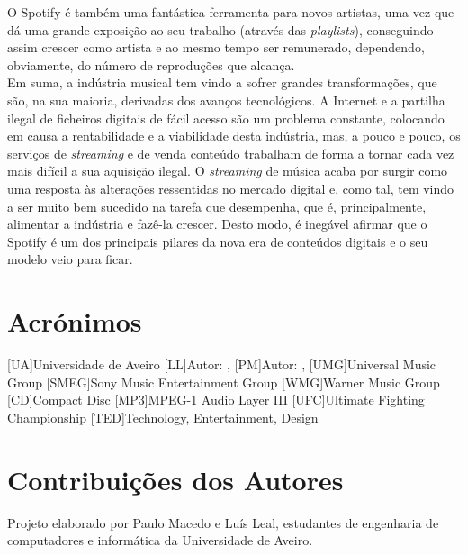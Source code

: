 O Spotify é também uma fantástica ferramenta para novos artistas, uma vez que dá uma grande exposição ao seu trabalho (através das \textit{playlists}), conseguindo assim crescer como artista e ao mesmo tempo ser remunerado, dependendo, obviamente, do número de reproduções que alcança.\\  
Em suma, a indústria musical tem vindo a sofrer grandes transformações, que são, na sua maioria, derivadas dos avanços tecnológicos. A Internet e a partilha ilegal de ficheiros digitais de fácil acesso são um problema constante, colocando em causa a rentabilidade e a viabilidade desta
indústria, mas, a pouco e pouco, os serviços de \textit{streaming} e de venda conteúdo trabalham de forma a tornar cada vez mais difícil a sua aquisição ilegal. O \textit{streaming} de música acaba por surgir como uma resposta às alterações ressentidas no mercado digital e, como tal, tem vindo a ser muito bem sucedido na tarefa que desempenha, que é, principalmente, alimentar a indústria e fazê-la crescer. Desto modo, é inegável afirmar que o Spotify é um dos principais pilares da nova era de conteúdos digitais e o seu modelo veio para ficar.

\chapter*{Acrónimos}

\begin{acronym}

	[UA]{Universidade de Aveiro}
	[LL]{Autor: \autorluis , \numautorluis }
	[PM]{Autor: \autorpaulo , \numautorpaulo }
	[UMG]{Universal Music Group}
	[SMEG]{Sony Music Entertainment Group}
	[WMG]{Warner Music Group}
	[CD]{Compact Disc}
	[MP3]{MPEG-1 Audio Layer III}
	[UFC]{Ultimate Fighting Championship}
	[TED]{Technology, Entertainment, Design}
	
\end{acronym}
\chapter*{Contribuições dos Autores}

Projeto elaborado por Paulo Macedo e Luís Leal, estudantes de engenharia de computadores e informática da Universidade de Aveiro.



